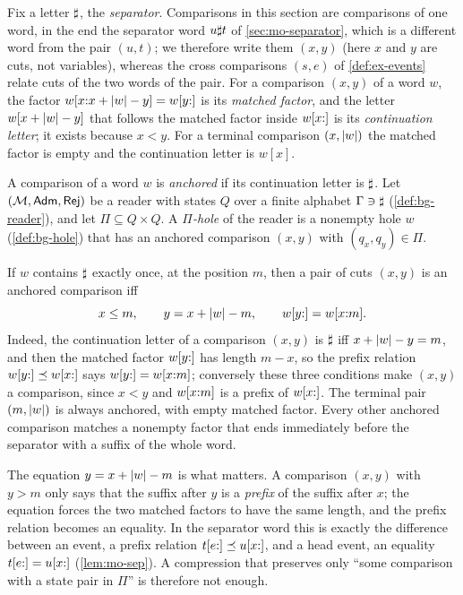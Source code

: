 Fix a letter $\sharp$, the \emph{separator}. Comparisons in this section are
comparisons of one word, in the end the separator word $u\sharp t$ of
\cref{sec:mo-separator}, which is a different word from the pair $(u,t)$; we
therefore write them $(x,y)$ (here $x$ and $y$ are cuts, not variables),
whereas the cross comparisons $(s,e)$ of \cref{def:ex-events} relate cuts of
the two words of the pair. For a comparison $(x,y)$ of a word $w$, the factor $w[x{:}x+\lvert w\rvert-y]=w[y{:}]$ is its \emph{matched factor},
and the letter $w[x+\lvert w\rvert-y]$ that follows the matched factor inside
$w[x{:}]$ is its \emph{continuation letter}; it exists because $x<y$. For a
terminal comparison $(x,\lvert w\rvert)$ the matched factor is empty and the
continuation letter is $w[x]$.

\begin{definition}\label{def:mo-anchored}
A comparison of a word $w$ is \emph{anchored} if its continuation letter is
$\sharp$. Let $(\mathcal M,\mathsf{Adm},\mathsf{Rej})$ be a reader with states $Q$ over a finite
alphabet $\Gamma\ni\sharp$ (\cref{def:bg-reader}), and let $\Pi\subseteq Q\times
Q$. A \emph{$\Pi$-hole} of the reader is a nonempty hole $w$
(\cref{def:bg-hole}) that has an anchored comparison $(x,y)$ with
$(q_x,q_y)\in\Pi$.
\end{definition}

If $w$ contains $\sharp$ exactly once, at the position $m$, then a pair of cuts
$(x,y)$ is an anchored comparison iff
\[
 x\le m,\qquad y=x+\lvert w\rvert-m,\qquad w[y{:}]=w[x{:}m] .
\]
Indeed, the continuation letter of a comparison $(x,y)$ is $\sharp$ iff
$x+\lvert w\rvert-y=m$, and then the matched factor $w[y{:}]$ has length $m-x$, so the
prefix relation $w[y{:}]\preceq w[x{:}]$ says $w[y{:}]=w[x{:}m]$; conversely
these three conditions make $(x,y)$ a comparison, since $x<y$ and $w[x{:}m]$
is a prefix of $w[x{:}]$. The terminal pair $(m,\lvert w\rvert)$ is always anchored,
with empty matched factor. Every other anchored comparison matches a nonempty
factor that ends immediately before the separator with a suffix of the whole
word.

The equation $y=x+\lvert w\rvert-m$ is what matters. A comparison $(x,y)$ with $y>m$
only says that the suffix after $y$ is a \emph{prefix} of the suffix after
$x$; the equation forces the two matched factors to have the same length, and
the prefix relation becomes an equality. In the separator word this is exactly
the difference between an event, a prefix relation $t[e{:}]\preceq u[x{:}]$, and
a head event, an equality $t[e{:}]=u[x{:}]$ (\cref{lem:mo-sep}). A
compression that preserves only ``some comparison with a state pair in $\Pi$''
is therefore not enough.

